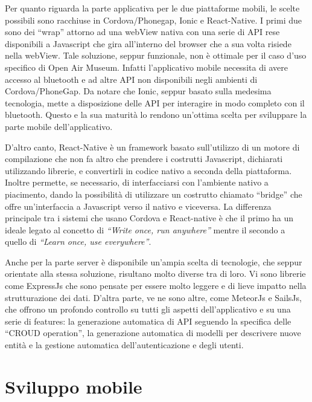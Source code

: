 Per quanto riguarda la parte applicativa per le due piattaforme mobili, le scelte possibili sono racchiuse in Cordova/Phonegap, Ionic e React-Native. I primi due sono dei “wrap” attorno ad una webView nativa con una serie di API rese disponibili a Javascript che gira all’interno del browser che a sua volta risiede nella webView. Tale soluzione, seppur funzionale, non è ottimale per il caso d’uso specifico di Open Air Museum. Infatti l’applicativo mobile necessita di avere accesso al bluetooth e ad altre API non disponibili negli ambienti di Cordova/PhoneGap. Da notare che Ionic, seppur basato sulla medesima tecnologia, mette a disposizione delle API per interagire in modo completo con il bluetooth. Questo e la sua maturità lo rendono un'ottima scelta per sviluppare la parte mobile dell’applicativo.\vspace{5mm} 

D’altro canto, React-Native è un framework basato sull’utilizzo di un motore di compilazione che non fa altro che prendere i costrutti Javascript, dichiarati utilizzando librerie, e convertirli in codice nativo a seconda della piattaforma. Inoltre permette, se necessario, di interfacciarsi con l’ambiente nativo a piacimento, dando la possibilità di utilizzare un costrutto chiamato “bridge” che offre un’interfaccia a Javascript verso il nativo e viceversa. La differenza principale tra i sistemi che usano Cordova e React-native è che il primo ha un ideale legato al concetto di \emph{“Write once, run anywhere”} mentre il secondo a quello di \emph{“Learn once, use everywhere”}.\vspace{5mm}

Anche per la parte server è disponibile un'ampia scelta di tecnologie, che seppur orientate alla stessa soluzione, risultano molto diverse tra di loro. Vi sono librerie come ExpressJs che sono pensate per essere molto leggere e di lieve impatto nella strutturazione dei dati. D'altra parte, ve ne sono altre, come MeteorJs e SailsJs, che offrono un profondo controllo su tutti gli aspetti dell’applicativo e su una serie di features: la generazione automatica di API seguendo la specifica delle “CROUD operation”, la generazione automatica di modelli per descrivere nuove entità e la gestione automatica dell’autenticazione e degli utenti.\vspace{5mm}

\section{Sviluppo mobile}\vspace{5mm}


